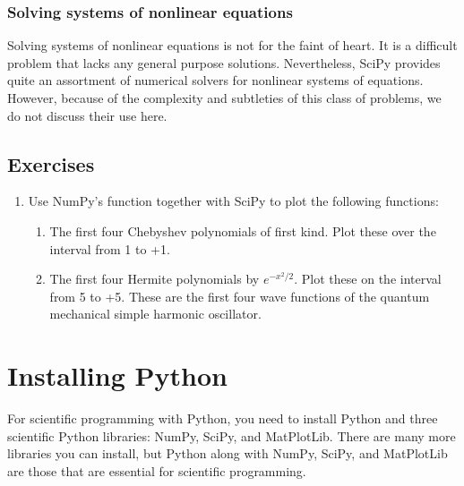 \documentclass[letterpaper,10pt,english]{sphinxmanual}
\begin{document}
\ignorespaces 

\subsection{Solving systems of nonlinear equations}
\label{\detokenize{chap9/chap9_scipy:solving-systems-of-nonlinear-equations}}\label{\detokenize{chap9/chap9_scipy:index-15}}
\sphinxAtStartPar
Solving systems of nonlinear equations is not for the faint of heart.  It is a difficult problem that lacks any general purpose solutions.  Nevertheless, SciPy provides quite an assortment of numerical solvers for nonlinear systems of equations.  However, because of the complexity and subtleties of this class of problems, we do not discuss their use here.

\newpage


\section{Exercises}
\label{\detokenize{chap9/chap9_scipy:exercises}}\begin{enumerate}
%
\item {} 
\sphinxAtStartPar
Use NumPy’s  function together with SciPy to plot the following functions:
\begin{enumerate}
%
\item {} 
\sphinxAtStartPar
The first four Chebyshev polynomials of first kind.  Plot these over the interval from \sphinxhyphen{}1 to +1.

\item {} 
\sphinxAtStartPar
The first four Hermite polynomials   by \(e^{-x^2/2}\).  Plot these on the interval from \sphinxhyphen{}5 to +5.  These are the first four wave functions of the quantum mechanical simple harmonic oscillator.

\end{enumerate}

\end{enumerate}

\appendix
{}\label{\detokenize{apdx1/apdx1_install::doc}}

\chapter{Installing Python}
\label{\detokenize{apdx1/apdx1_install:installing-python}}\label{\detokenize{apdx1/apdx1_install:apdx1}}
\ignorespaces 
\sphinxAtStartPar
For scientific programming with Python, you need to install Python and three scientific Python libraries: NumPy, SciPy, and MatPlotLib.  There are many more libraries you can install, but Python along with NumPy, SciPy, and MatPlotLib are those that are essential for scientific programming.
\end{document}
